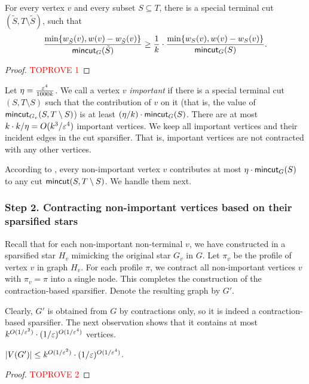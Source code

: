 \begin{claim} \label{lem:contribution}
For every vertex $v$ and every subset $S\subseteq T$, there is a special terminal cut $(\tilde S,T\setminus \tilde S)$, such that 
$$\frac{\min \{w_{\tilde S}(v),w(v)-w_{\tilde S}(v)\}}{\mathsf{mincut}_G(\tilde S)} \ge \frac{1}{k}\cdot \frac{\min \{w_S(v),w(v)-w_S(v)\}}{\mathsf{mincut}_G(S)}.$$
\end{claim}

\begin{proof}\textcolor{red}{TOPROVE 1}\end{proof}

Let $\eta = \frac{{\varepsilon}^4}{1000k}$. We call a vertex $v$ \emph{important} if there is a special terminal cut $(S,T\setminus S)$ such that the contribution of $v$ on it (that is, the value of $\mathsf{mincut}_{G_v}(S,T\setminus S)$) is at least $(\eta/k)\cdot \mathsf{mincut}_G(S)$. There are at most $k \cdot k/\eta  = O(k^3/{\varepsilon}^4)$ important vertices. We keep all important vertices and their incident edges in the cut sparsifier. That is, important vertices are not contracted with any other vertices.

According to , every non-important vertex $v$ contributes at most $\eta \cdot \mathsf{mincut}_G(S)$ to any cut $\mathsf{mincut}(S,T\setminus S)$. We handle them next.



\subsubsection*{Step 2. Contracting non-important vertices based on their sparsified stars}

Recall that for each non-important non-terminal $v$, we have constructed in  a sparsified star $H_v$ mimicking the original star $G_v$ in $G$. Let $\pi_v$ be the profile of vertex $v$ in graph $H_v$. For each profile $\pi$, we contract all non-important vertices $v$ with $\pi_v=\pi$ into a single node. This completes the construction of the contraction-based sparsifier. Denote the resulting graph by $G'$.

Clearly, $G'$ is obtained from $G$ by contractions only, so it is indeed a contraction-based sparsifier. The next observation shows that it contains at most 
$k^{O(1/{\varepsilon}^2)}\cdot (1/{\varepsilon})^{O(1/{\varepsilon}^4)}$ vertices.

\begin{observation}
$|V(G')|\le k^{O(1/{\varepsilon}^2)}\cdot (1/{\varepsilon})^{O(1/{\varepsilon}^4)}$.
\end{observation} 
\begin{proof}\textcolor{red}{TOPROVE 2}\end{proof}

